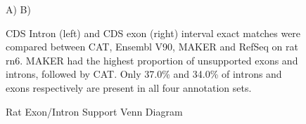 \documentclass[fleqn,10pt]{wlscirep}
\begin{document}
\begin{figure}
\centering
A)
B)
\caption{Rat Exon/Intron Support Venn Diagram}
CDS Intron (left) and CDS exon (right) interval exact matches were compared between CAT, Ensembl V90, MAKER and RefSeq on rat rn6. MAKER had the highest proportion of unsupported exons and introns, followed by CAT. Only 37.0\% and 34.0\% of introns and exons respectively are present in all four annotation sets.
\label{supp_fig:rat_exon_intron}
\end{figure}
\end{document}
